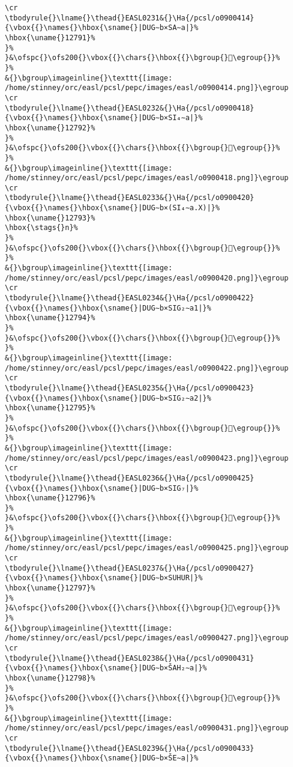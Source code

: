 \begin{verbatim}
\cr
\tbodyrule{}\lname{}\thead{}EASL0231&{}\Ha{/pcsl/o0900414}{\vbox{{}\names{}\hbox{\sname{}|DUG∼b×SA∼a|}%
\hbox{\uname{}12791}%
}%
}&\ofspc{}\ofs200{}\vbox{{}\chars{}\hbox{{}\bgroup{}𒞑\egroup{}}%
}%
&{}\bgroup\imageinline{}\texttt{[image: /home/stinney/orc/easl/pcsl/pepc/images/easl/o0900414.png]}\egroup
\cr
\tbodyrule{}\lname{}\thead{}EASL0232&{}\Ha{/pcsl/o0900418}{\vbox{{}\names{}\hbox{\sname{}|DUG∼b×SI₄∼a|}%
\hbox{\uname{}12792}%
}%
}&\ofspc{}\ofs200{}\vbox{{}\chars{}\hbox{{}\bgroup{}𒞒\egroup{}}%
}%
&{}\bgroup\imageinline{}\texttt{[image: /home/stinney/orc/easl/pcsl/pepc/images/easl/o0900418.png]}\egroup
\cr
\tbodyrule{}\lname{}\thead{}EASL0233&{}\Ha{/pcsl/o0900420}{\vbox{{}\names{}\hbox{\sname{}|DUG∼b×(SI₄∼a.X)|}%
\hbox{\uname{}12793}%
\hbox{\stags{}n}%
}%
}&\ofspc{}\ofs200{}\vbox{{}\chars{}\hbox{{}\bgroup{}𒞓\egroup{}}%
}%
&{}\bgroup\imageinline{}\texttt{[image: /home/stinney/orc/easl/pcsl/pepc/images/easl/o0900420.png]}\egroup
\cr
\tbodyrule{}\lname{}\thead{}EASL0234&{}\Ha{/pcsl/o0900422}{\vbox{{}\names{}\hbox{\sname{}|DUG∼b×SIG₂∼a1|}%
\hbox{\uname{}12794}%
}%
}&\ofspc{}\ofs200{}\vbox{{}\chars{}\hbox{{}\bgroup{}𒞔\egroup{}}%
}%
&{}\bgroup\imageinline{}\texttt{[image: /home/stinney/orc/easl/pcsl/pepc/images/easl/o0900422.png]}\egroup
\cr
\tbodyrule{}\lname{}\thead{}EASL0235&{}\Ha{/pcsl/o0900423}{\vbox{{}\names{}\hbox{\sname{}|DUG∼b×SIG₂∼a2|}%
\hbox{\uname{}12795}%
}%
}&\ofspc{}\ofs200{}\vbox{{}\chars{}\hbox{{}\bgroup{}𒞕\egroup{}}%
}%
&{}\bgroup\imageinline{}\texttt{[image: /home/stinney/orc/easl/pcsl/pepc/images/easl/o0900423.png]}\egroup
\cr
\tbodyrule{}\lname{}\thead{}EASL0236&{}\Ha{/pcsl/o0900425}{\vbox{{}\names{}\hbox{\sname{}|DUG∼b×SIG₇|}%
\hbox{\uname{}12796}%
}%
}&\ofspc{}\ofs200{}\vbox{{}\chars{}\hbox{{}\bgroup{}𒞖\egroup{}}%
}%
&{}\bgroup\imageinline{}\texttt{[image: /home/stinney/orc/easl/pcsl/pepc/images/easl/o0900425.png]}\egroup
\cr
\tbodyrule{}\lname{}\thead{}EASL0237&{}\Ha{/pcsl/o0900427}{\vbox{{}\names{}\hbox{\sname{}|DUG∼b×SUHUR|}%
\hbox{\uname{}12797}%
}%
}&\ofspc{}\ofs200{}\vbox{{}\chars{}\hbox{{}\bgroup{}𒞗\egroup{}}%
}%
&{}\bgroup\imageinline{}\texttt{[image: /home/stinney/orc/easl/pcsl/pepc/images/easl/o0900427.png]}\egroup
\cr
\tbodyrule{}\lname{}\thead{}EASL0238&{}\Ha{/pcsl/o0900431}{\vbox{{}\names{}\hbox{\sname{}|DUG∼b×ŠAH₂∼a|}%
\hbox{\uname{}12798}%
}%
}&\ofspc{}\ofs200{}\vbox{{}\chars{}\hbox{{}\bgroup{}𒞘\egroup{}}%
}%
&{}\bgroup\imageinline{}\texttt{[image: /home/stinney/orc/easl/pcsl/pepc/images/easl/o0900431.png]}\egroup
\cr
\tbodyrule{}\lname{}\thead{}EASL0239&{}\Ha{/pcsl/o0900433}{\vbox{{}\names{}\hbox{\sname{}|DUG∼b×ŠE∼a|}%

\end{verbatim}
